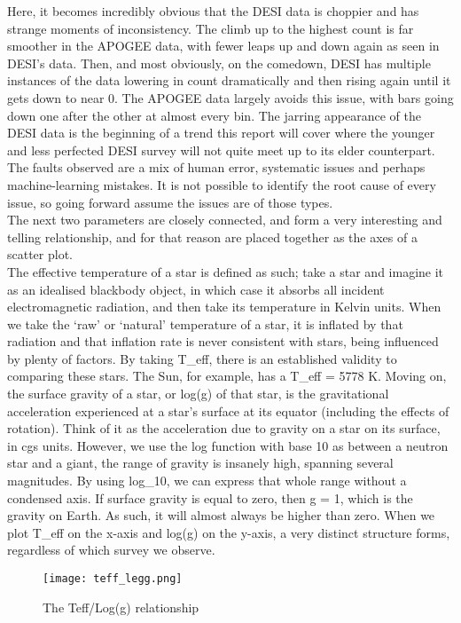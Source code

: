 \documentclass{article}
\begin{document}
\indent Here, it becomes incredibly obvious that the DESI data is choppier and has strange moments of inconsistency. The climb up to the highest count is far smoother in the APOGEE data, with fewer leaps up and down again as seen in DESI’s data. Then, and most obviously, on the comedown, DESI has multiple instances of the data lowering in count dramatically and then rising again until it gets down to near 0. The APOGEE data largely avoids this issue, with bars going down one after the other at almost every bin. The jarring appearance of the DESI data is the beginning of a trend this report will cover where the younger and less perfected DESI survey will not quite meet up to its elder counterpart. The faults observed are a mix of human error, systematic issues and perhaps machine-learning mistakes. It is not possible to identify the root cause of every issue, so going forward assume the issues are of those types.\\
\indent The next two parameters are closely connected, and form a very interesting and telling relationship, and for that reason are placed together as the axes of a scatter plot. \\
\indent The effective temperature of a star is defined as such; take a star and imagine it as an idealised blackbody object, in which case it absorbs all incident electromagnetic radiation, and then take its temperature in Kelvin units. When we take the ‘raw’ or ‘natural’ temperature of a star, it is inflated by that radiation and that inflation rate is never consistent with stars, being influenced by plenty of factors. By taking T\_eff, there is an established validity to comparing these stars. The Sun, for example, has a T\_eff = 5778 K. Moving on, the surface gravity of a star, or log(g) of that star, is the gravitational acceleration experienced at a star's surface at its equator (including the effects of rotation). Think of it as the acceleration due to gravity on a star on its surface, in cgs units. However, we use the log function with base 10 as between a neutron star and a giant, the range of gravity is insanely high, spanning several magnitudes. By using log\_10, we can express that whole range without a condensed axis. If surface gravity is equal to zero, then g = 1, which is the gravity on Earth. As such, it will almost always be higher than zero. When we plot T\_eff on the x-axis and log(g) on the y-axis, a very distinct structure forms, regardless of which survey we observe.\\

\begin{figure}[h!tbp]
    \centering
    \texttt{[image: teff\_legg.png]}
    \caption{The Teff/Log(g) relationship}
    \label{fig:3}
\end{figure}
\end{document}
